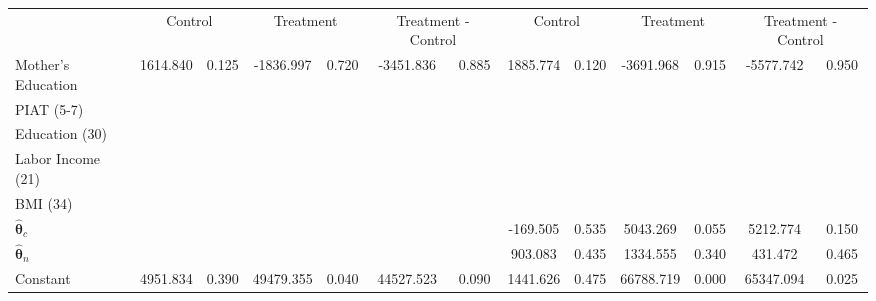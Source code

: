 \begin{tabular}{lcccccccccccc} \toprule
&\multicolumn{2}{c}{Control} & \multicolumn{2}{c}{Treatment} & \multicolumn{2}{c}{Treatment - Control} & \multicolumn{2}{c}{Control} & \multicolumn{2}{c}{Treatment} & \multicolumn{2}{c}{Treatment - Control} \\
Mother's Education &  1614.840 &     0.125 & -1836.997 &     0.720 & -3451.836 &     0.885 &  1885.774 &     0.120 & -3691.968 &     0.915 & -5577.742 &     0.950 \\  
PIAT (5-7) &         &         &         &         &         &         &         &         &         &         &         &          \\  
Education (30)  &         &         &         &         &         &         &         &         &         &         &         &         \\  
Labor Income (21)  &         &         &         &         &         &         &         &         &         &         &         &         \\  
BMI (34)  &         &         &         &         &         &         &         &         &         &         &         &         \\  
$\hat{\bm{\theta}}_c$ &         &         &         &         &         &         &  -169.505 &     0.535 &  5043.269 &     0.055 &  5212.774 &     0.150 \\  
$\hat{\bm{\theta}}_n$ &         &         &         &         &         &         &   903.083 &     0.435 &  1334.555 &     0.340 &   431.472 &     0.465 \\  
Constant &  4951.834 &     0.390 & 49479.355 &     0.040 & 44527.523 &     0.090 &  1441.626 &     0.475 & 66788.719 &     0.000 & 65347.094 &     0.025 \\  
\bottomrule \end{tabular}